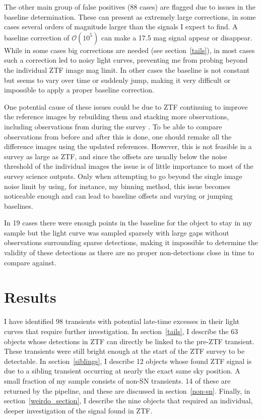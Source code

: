 \documentclass[a4paper,oneside,12pt, class=Latex/Classes/PhDthesisPSnPDF, crop=false]{standalone}
\begin{document}
The other main group of false positives (88 cases) are flagged due to issues in the baseline determination. These can present as extremely large corrections, in some cases several orders of magnitude larger than the signals I expect to find. A baseline correction of $\mathcal{O}(10^5)$ can make a 17.5 mag signal appear or disappear. While in some cases big corrections are needed (see section~\ref{tails}), in most cases such a correction led to noisy light curves, preventing me from probing beyond the individual ZTF image mag limit. In other cases the baseline is not constant but seems to vary over time or suddenly jump, making it very difficult or impossible to apply a proper baseline correction.

One potential cause of these issues could be due to ZTF continuing to improve the reference images by rebuilding them and stacking more observations, including observations from during the survey \citep{ZTF_Instrumentation}. To be able to compare observations from before and after this is done, one should remake all the difference images using the updated references. However, this is not feasible in a survey as large as ZTF, and since the offsets are usually below the noise threshold of the individual images the issue is of little importance to most of the survey science outputs. Only when attempting to go beyond the single image noise limit by using, for instance, my binning method, this issue becomes noticeable enough and can lead to baseline offsets and varying or jumping baselines.

In 19 cases there were enough points in the baseline for the object to stay in my sample but the light curve was sampled sparsely with large gaps without observations surrounding sparse detections, making it impossible to determine the validity of these detections as there are no proper non-detections close in time to compare against.


\section{Results}
\label{Pre-ZTF_results}
I have identified 98 transients with potential late-time excesses in their light curves that require further investigation. In section~\ref{tails}, I describe the 63 objects whose detections in ZTF can directly be linked to the pre-ZTF transient. These transients were still bright enough at the start of the ZTF survey to be detectable. In section~\ref{siblings}, I describe 12 objects whose found ZTF signal is due to a sibling transient occurring at nearly the exact same sky position. A small fraction of my sample consists of non-SN transients. 14 of these are returned by the pipeline, and these are discussed in section~\ref{non-sn}. Finally, in section~\ref{weirdo_section}, I describe the nine objects that required an individual, deeper investigation of the signal found in ZTF.
\end{document}
